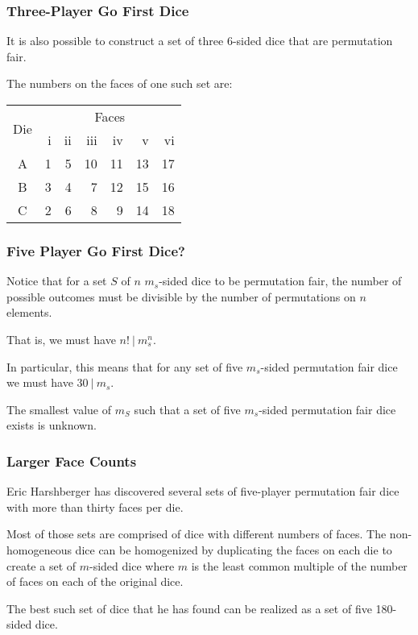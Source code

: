 \documentclass[aspectratio=169]{beamer}
\begin{document}
\begin{frame}[triangle=siiblue]
\frametitle{Three-Player Go First Dice}
It is also possible to construct a set of three 6-sided dice that are permutation fair. 

\vfill

The numbers on the faces of one such set are:
{
\footnotesize
\begin{table}
\begin{tabular}{c rrrrrr} \toprule
\multirow{2}[2]{*}{Die} &  \multicolumn{6}{c}{Faces} \\ \cmidrule(lr){2-7}     
   & i & ii & iii & iv & v & vi \\ \midrule
A & 1 & 5 & 10 & 11 & 13 & 17 \\
B & 3 & 4 & 7 & 12 & 15 & 16 \\
C & 2 & 6 & 8 & 9 & 14 & 18 \\ \bottomrule
\end{tabular}
\end{table}
}
\end{frame}

\begin{frame}[triangle=siiblue]
\frametitle{Five Player Go First Dice?}
Notice that for a set $S$ of $n$ $m_s$-sided dice to be permutation fair,  the number of possible outcomes must be divisible by the number of permutations on $n$ elements.

\vfill

That is, we must have $n! \ \vert \ m_s^n$.

\vfill

In particular, this means that for any set of five $m_s$-sided permutation fair dice we must have $ 30 \ \vert \ m_s$.

\vfill

The smallest value of $m_S$ such that a set of five $m_s$-sided permutation fair dice exists is unknown.

\end{frame}

\begin{frame}[triangle=siiblue]
\frametitle{Larger Face Counts}
Eric Harshberger has discovered several sets of five-player permutation fair dice with more than thirty faces per die.

\vfill

Most of those sets are comprised of dice with different numbers of faces.  The non-homogeneous dice can be homogenized by duplicating the faces on each die to create a set of $m$-sided dice where $m$ is the least common multiple of the number of faces on each of the original dice.

\vfill

The best such set of dice that he has found can be realized as a set of five 180-sided dice.
\end{frame}
\end{document}
